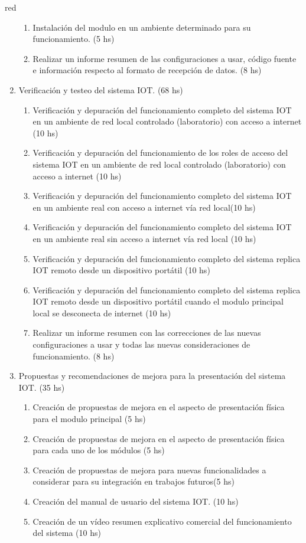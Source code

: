 \documentclass[11pt]{charter}
\begin{document}
\begin{consigna}{red}
\begin{enumerate}
\begin{enumerate}
	\item Instalación del modulo en un ambiente determinado para su funcionamiento. (5 hs)
	\item Realizar un informe resumen de las configuraciones a usar, código fuente e información respecto al formato de recepción de datos. (8 hs)
	\end{enumerate}
\item Verificación y testeo del sistema IOT. (68 hs)
	\begin{enumerate}
	\item Verificación y depuración del funcionamiento completo del sistema IOT en un ambiente de red local controlado (laboratorio) con acceso a internet (10 hs)
	\item Verificación y depuración del funcionamiento de los roles de acceso del sistema IOT en un ambiente de red local controlado (laboratorio) con acceso a internet (10 hs) 
	\item Verificación y depuración del funcionamiento completo del sistema IOT en un ambiente real con acceso a internet vía red local(10 hs) 
	\item Verificación y depuración del funcionamiento completo del sistema IOT en un ambiente real sin acceso a internet vía red local (10 hs) 
	\item Verificación y depuración del funcionamiento completo del sistema replica IOT remoto desde un dispositivo portátil (10 hs)
	\item Verificación y depuración del funcionamiento completo del sistema replica IOT remoto desde un dispositivo portátil cuando el modulo principal local se desconecta de internet (10 hs)
	\item Realizar un informe resumen con las correcciones de las nuevas configuraciones a usar y todas las nuevas consideraciones de funcionamiento. (8 hs)
	\end{enumerate}
\item Propuestas y recomendaciones de mejora para la presentación del sistema IOT. (35 hs)
	\begin{enumerate}
	\item Creación de propuestas de mejora en el aspecto de presentación física para el modulo principal (5 hs)
	\item Creación de propuestas de mejora en el aspecto de presentación física para cada uno de los módulos (5 hs)
	\item Creación de propuestas de mejora para nuevas funcionalidades a considerar para su integración en trabajos futuros(5 hs)
	\item Creación del manual de usuario del sistema IOT. (10 hs)
	\item Creación de un vídeo resumen explicativo comercial del funcionamiento del sistema (10 hs)
	\end{enumerate}	
		

\end{enumerate}
\end{consigna}
\end{document}

